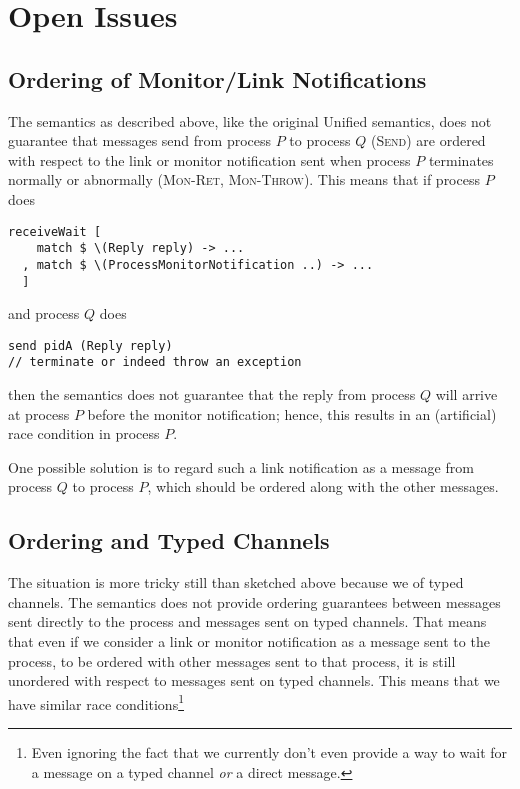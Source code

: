\documentclass{article}
\begin{document}
\section{Open Issues}

\subsection{Ordering of Monitor/Link Notifications}

The semantics as described above, like the original Unified semantics, does not
guarantee that messages send from process $P$ to process $Q$ (\textsc{Send})
are ordered with respect to the link or monitor notification sent when process
$P$ terminates normally or abnormally (\textsc{Mon-Ret}, \textsc{Mon-Throw}). This means that if process $P$ does

\begin{lstlisting}
receiveWait [
    match $ \(Reply reply) -> ...
  , match $ \(ProcessMonitorNotification ..) -> ...
  ]
\end{lstlisting}

and process $Q$ does

\begin{lstlisting}
send pidA (Reply reply)
// terminate or indeed throw an exception
\end{lstlisting}

then the semantics does not guarantee that the reply from process $Q$ will
arrive at process $P$ before the monitor notification; hence, this results in
an (artificial) race condition in process $P$.

One possible solution is to regard such a link notification as a message from
process $Q$ to process $P$, which should be ordered along with the other
messages.

\subsection{Ordering and Typed Channels}

The situation is more tricky still than sketched above because we of typed
channels. The semantics does not provide ordering guarantees between messages
sent directly to the process and messages sent on typed channels. That means
that even if we consider a link or monitor notification as a message sent to
the process, to be ordered with other messages sent to that process, it is
still unordered with respect to messages sent on typed channels. This means
that we have similar race conditions\footnote{Even ignoring the fact that we
currently don't even provide a way to wait for a message on a typed channel
\emph{or} a direct message.} 
\end{document}

